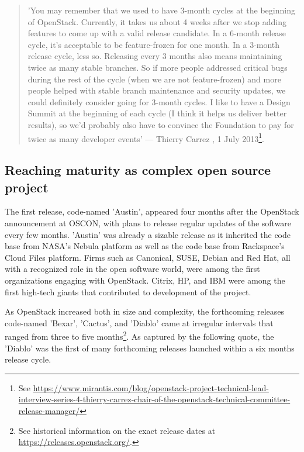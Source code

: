  
\begin{quotation}
\footnotesize 
'You may remember that we used to have 3-month cycles at the beginning of OpenStack. Currently, it takes us about 4 weeks after we stop adding features to come up with a valid release candidate. In a 6-month release cycle, it’s acceptable to be feature-frozen for one month. In a 3-month release cycle, less so. Releasing every 3 months also means maintaining twice as many stable branches. So if more people addressed critical bugs during the rest of the cycle (when we are not feature-frozen) and more people helped with stable branch maintenance and security updates, we could definitely consider going for 3-month cycles. I like to have a Design Summit at the beginning of each cycle (I think it helps us deliver better results), so we’d probably also have to convince the Foundation to pay for twice as many developer events' --- Thierry Carrez , 1 July 2013\footnote{See \url{https://www.mirantis.com/blog/openstack-project-technical-lead-interview-series-4-thierry-carrez-chair-of-the-openstack-technical-committee-release-manager/}}. 
\end{quotation}



\subsection{Reaching maturity as complex open source project}

The first release, code-named 'Austin', appeared four months after the OpenStack announcement at OSCON, with plans to release regular updates of the software every few months. 'Austin' was already a sizable release as it inherited the code base from NASA's Nebula platform as well as the code base from Rackspace's Cloud Files platform.  Firms such as Canonical, SUSE, Debian and  Red Hat, all with a recognized role in the open software world, were among the first organizations engaging with OpenStack. Citrix, HP, and IBM were among the first high-tech giants that contributed to development of the project. 

As OpenStack increased both  in size and  complexity, the forthcoming releases code-named 'Bexar', 'Cactus', and 'Diablo' came at irregular intervals that ranged from three to five months\footnote{See historical information on the exact release dates at \url{https://releases.openstack.org/}.}. As captured by the following quote, the  'Diablo' was the first of many forthcoming releases launched within a six months release cycle. 

